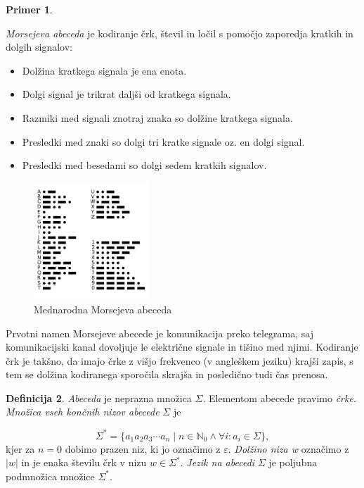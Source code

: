\documentclass{amsart}
\newcommand{\N}{\mathbb{N}}
\theoremstyle{definition} %
\newtheorem{definicija}{Definicija}[section]
\newtheorem{primer}[definicija]{Primer}
\theoremstyle{plain} %
\begin{document}
\begin{primer}\label{Morse}

    \textit{Morsejeva abeceda} je kodiranje črk, števil in ločil s pomočjo zaporedja kratkih
    in dolgih signalov:

    \begin{itemize}
        \item Dolžina kratkega signala je ena enota.
        \item Dolgi signal je trikrat daljši od kratkega signala.
        \item Razmiki med signali znotraj znaka so dolžine kratkega signala.
        \item Presledki med znaki so dolgi tri kratke signale oz. en dolgi signal.
        \item Presledki med besedami so dolgi sedem kratkih signalov.
    \end{itemize}

    \begin{figure}[h]
        \centering
        \includegraphics[width=4.3cm]{International_Morse_Code.svg.png}
        \caption{Mednarodna Morsejeva abeceda}
        \label{fig:Morse}
    \end{figure}

    Prvotni namen Morsejeve abecede je komunikacija preko telegrama, saj komunikacijski
    kanal dovoljuje le električne signale in tišino med njimi. Kodiranje črk je takšno,
    da imajo črke z višjo frekvenco (v angleškem jeziku) krajši zapis, s tem se dolžina
    kodiranega sporočila skrajša in posledično tudi čas prenosa.

\end{primer}

\begin{definicija}

    \textit{Abeceda} je neprazna množica $ \Sigma $. Elementom abecede pravimo \textit{črke}.
    \textit{Množica vseh končnih nizov abecede} $ \Sigma $ je

    \[
        \Sigma^* = \{ a_1 a_2 a_3 \cdots a_n \mid n \in \N_0 \land \forall i: a_i \in \Sigma \}, 
    \]
    kjer za $ n = 0 $ dobimo prazen niz, ki jo označimo z $ \varepsilon $.
    \textit{Dolžino niza w} označimo z $ |w| $ in je enaka številu črk v nizu $ w \in \Sigma^* $.
    \textit{Jezik na abecedi} $ \Sigma $ je poljubna podmnožica množice $ \Sigma^* $. 

\end{definicija}
\end{document}
